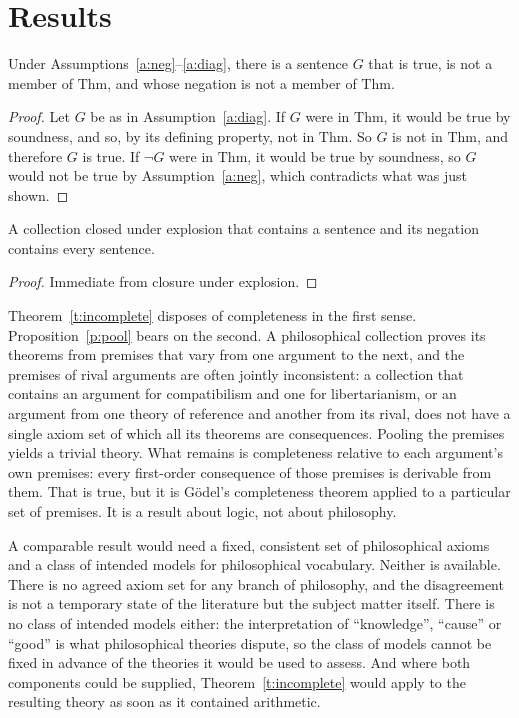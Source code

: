 \documentclass{situationist-preprint}
\begin{document}
\section{Results}

\begin{theorem}\label{t:incomplete}
Under Assumptions~\ref{a:neg}--\ref{a:diag}, there is a sentence $G$ that is true, is not a member of $\mathrm{Thm}$, and whose negation is not a member of $\mathrm{Thm}$.
\end{theorem}

\begin{proof}
Let $G$ be as in Assumption~\ref{a:diag}. If $G$ were in $\mathrm{Thm}$, it would be true by soundness, and so, by its defining property, not in $\mathrm{Thm}$. So $G$ is not in $\mathrm{Thm}$, and therefore $G$ is true. If $\neg G$ were in $\mathrm{Thm}$, it would be true by soundness, so $G$ would not be true by Assumption~\ref{a:neg}, which contradicts what was just shown.
\end{proof}

\begin{proposition}\label{p:pool}
A collection closed under explosion that contains a sentence and its negation contains every sentence.
\end{proposition}

\begin{proof}
Immediate from closure under explosion.
\end{proof}

Theorem~\ref{t:incomplete} disposes of completeness in the first sense. Proposition~\ref{p:pool} bears on the second. A philosophical collection proves its theorems from premises that vary from one argument to the next, and the premises of rival arguments are often jointly inconsistent: a collection that contains an argument for compatibilism and one for libertarianism, or an argument from one theory of reference and another from its rival, does not have a single axiom set of which all its theorems are consequences. Pooling the premises yields a trivial theory. What remains is completeness relative to each argument's own premises: every first-order consequence of those premises is derivable from them. That is true, but it is G\"odel's completeness theorem applied to a particular set of premises. It is a result about logic, not about philosophy.

A comparable result would need a fixed, consistent set of philosophical axioms and a class of intended models for philosophical vocabulary. Neither is available. There is no agreed axiom set for any branch of philosophy, and the disagreement is not a temporary state of the literature but the subject matter itself. There is no class of intended models either: the interpretation of \enquote{knowledge}, \enquote{cause} or \enquote{good} is what philosophical theories dispute, so the class of models cannot be fixed in advance of the theories it would be used to assess. And where both components could be supplied, Theorem~\ref{t:incomplete} would apply to the resulting theory as soon as it contained arithmetic.
\end{document}
